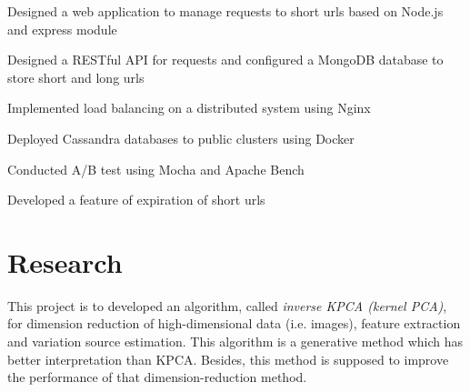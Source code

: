 \documentclass[]{Current-DS}
\begin{document}
\begin{minipage}[t]{0.66\textwidth}
\descript{}
\begin{tightemize}
\item Designed a web application to manage requests to short urls based on Node.js and express module
\item Designed a RESTful API for requests and configured a MongoDB database to store short and long urls
\item Implemented load balancing on a distributed system using Nginx
\item Deployed Cassandra databases to public clusters using Docker
\item Conducted A/B test using Mocha and Apache Bench
\item Developed a feature of expiration of short urls
\end{tightemize}
\sectionsep



\section{Research}
This project is to developed an algorithm, called \textit{inverse KPCA (kernel PCA)}, for dimension reduction of high-dimensional data (i.e. images), feature extraction and variation source estimation. This algorithm is a generative method which has better interpretation than KPCA. Besides, this method is supposed to improve the performance of that dimension-reduction method.
\sectionsep


\end{minipage}
\end{document}
